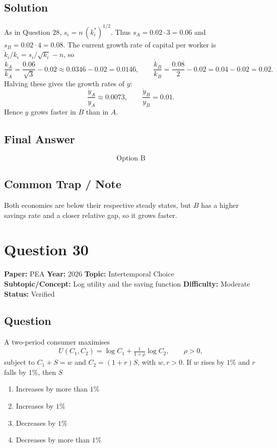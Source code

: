 \documentclass[11pt]{article}
\begin{document}
\subsection*{Solution}
As in Question 28, $s_i = n\,(k^*_i)^{1/2}$. Thus $s_A = 0.02\cdot 3 = 0.06$ and
$s_B = 0.02\cdot 4 = 0.08$. The current growth rate of capital per worker is
$\dot k_i/k_i = s_i/\sqrt{k_i} - n$, so
\[
\frac{\dot k_A}{k_A} = \frac{0.06}{\sqrt 3} - 0.02 \approx 0.0346 - 0.02 = 0.0146,
\qquad
\frac{\dot k_B}{k_B} = \frac{0.08}{2} - 0.02 = 0.04 - 0.02 = 0.02.
\]
Halving these gives the growth rates of $y$:
\[
\frac{\dot y_A}{y_A} \approx 0.0073, \qquad \frac{\dot y_B}{y_B} = 0.01.
\]
Hence $y$ grows faster in $B$ than in $A$.

\subsection*{Final Answer}
\[
\boxed{\text{Option B}}
\]

\subsection*{Common Trap / Note}
Both economies are below their respective steady states, but $B$ has a higher
savings rate and a closer relative gap, so it grows faster.

\section*{Question 30}
\textbf{Paper:} PEA \quad \textbf{Year:} 2026 \quad \textbf{Topic:} Intertemporal Choice \\
\textbf{Subtopic/Concept:} Log utility and the saving function \quad
\textbf{Difficulty:} Moderate \quad \textbf{Status:} Verified

\subsection*{Question}
A two-period consumer maximises
\[
U(C_1, C_2) = \log C_1 + \tfrac{1}{1+\rho}\log C_2, \qquad \rho > 0,
\]
subject to $C_1 + S = w$ and $C_2 = (1+r) S$, with $w, r > 0$. If $w$ rises by
$1\%$ and $r$ falls by $1\%$, then $S$
\begin{enumerate}[label=(\Alph*)]
\item Increases by more than $1\%$
\item Increases by $1\%$
\item Decreases by $1\%$
\item Decreases by more than $1\%$
\end{enumerate}
\end{document}
